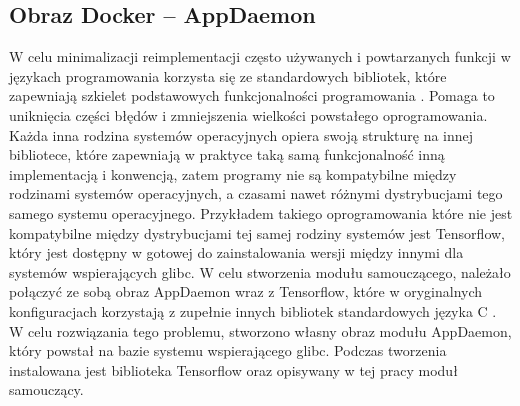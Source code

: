 \subsection{Obraz Docker -- AppDaemon}
W celu minimalizacji reimplementacji często używanych i powtarzanych funkcji w językach programowania korzysta się ze standardowych bibliotek, które zapewniają szkielet podstawowych funkcjonalności programowania \cite{book:cstdl}. Pomaga to uniknięcia części błędów i zmniejszenia wielkości powstałego oprogramowania. Każda inna rodzina systemów operacyjnych opiera swoją strukturę na innej bibliotece, które zapewniają w praktyce taką samą funkcjonalność inną implementacją i konwencją, zatem programy nie są kompatybilne między rodzinami systemów operacyjnych, a czasami nawet różnymi dystrybucjami tego samego systemu operacyjnego. Przykładem takiego oprogramowania które nie jest kompatybilne między dystrybucjami tej samej rodziny systemów jest Tensorflow, który jest dostępny w gotowej do zainstalowania wersji między innymi dla systemów wspierających glibc. W celu stworzenia modułu samouczącego, należało połączyć ze sobą obraz AppDaemon wraz z Tensorflow, które w oryginalnych konfiguracjach korzystają z zupełnie innych bibliotek standardowych języka C \cite{page:alpine_linux} \cite{page:ad_dockerfile}. W celu rozwiązania tego problemu, stworzono własny obraz modułu AppDaemon, który powstał na bazie systemu wspierającego glibc. Podczas tworzenia instalowana jest biblioteka Tensorflow oraz opisywany w tej pracy moduł samouczący.



